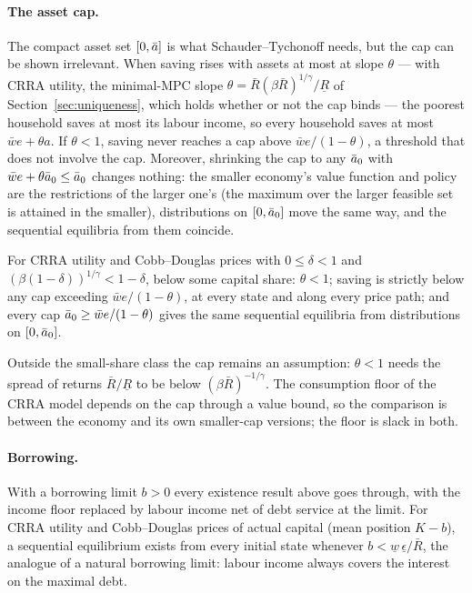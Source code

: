 \paragraph{The asset cap.} The compact asset set $[0,\bar a]$ is what Schauder--Tychonoff needs, but
the cap can be shown irrelevant. When saving rises with assets at most at slope $\theta$ --- with
CRRA utility, the minimal-MPC slope $\theta=\bar R(\beta\bar R)^{1/\gamma}/\underline R$ of
Section~\ref{sec:uniqueness}, which holds whether or not the cap binds --- the poorest household
saves at most its labour income, so every household saves at most $\bar w e+\theta a$. If
$\theta<1$, saving never reaches a cap above $\bar w e/(1-\theta)$, a threshold that does not
involve the cap. Moreover, shrinking the cap to any $\bar a_0$ with $\bar w e+\theta\bar a_0\le\bar a_0$
changes nothing: the smaller economy's value function and policy are the restrictions of the larger
one's (the maximum over the larger feasible set is attained in the smaller), distributions on
$[0,\bar a_0]$ move the same way, and the sequential equilibria from them coincide.

\begin{theorem}\label{thm:cap}
For CRRA utility and Cobb--Douglas prices with $0\le\delta<1$ and
$(\beta(1-\delta))^{1/\gamma}<1-\delta$, below some capital share: $\theta<1$; saving is strictly
below any cap exceeding $\bar w e/(1-\theta)$, at every state and along every price path; and every
cap $\bar a_0\ge\bar w e/(1-\theta)$ gives the same sequential equilibria from distributions on
$[0,\bar a_0]$.
\end{theorem}

\noindent
Outside the small-share class the cap remains an assumption: $\theta<1$ needs the spread of returns
$\bar R/\underline R$ to be below $(\beta\bar R)^{-1/\gamma}$. The consumption floor of the CRRA
model depends on the cap through a value bound, so the comparison is between the economy and its
own smaller-cap versions; the floor is slack in both.

\paragraph{Borrowing.} With a borrowing limit $b>0$ every existence result above goes through, with
the income floor replaced by labour income net of debt service at the limit. For CRRA utility and
Cobb--Douglas prices of actual capital (mean position $K-b$), a sequential equilibrium exists from
every initial state whenever $b<\underline w\,\underline\epsilon/\bar R$, the analogue of a natural
borrowing limit: labour income always covers the interest on the maximal debt.

